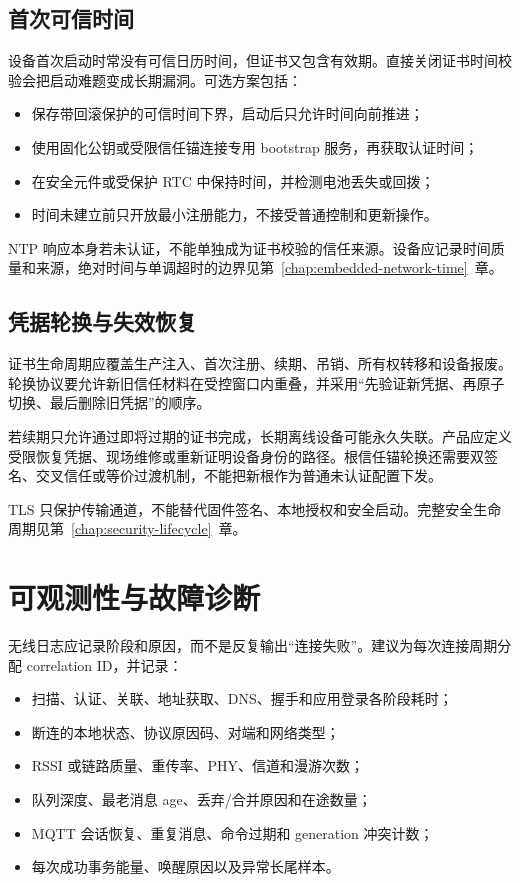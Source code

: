 \subsection{首次可信时间}

设备首次启动时常没有可信日历时间，但证书又包含有效期。直接关闭证书时间校验会把启动难题变成长期漏洞。可选方案包括：

\begin{itemize}
  \item 保存带回滚保护的可信时间下界，启动后只允许时间向前推进；
  \item 使用固化公钥或受限信任锚连接专用 bootstrap 服务，再获取认证时间；
  \item 在安全元件或受保护 RTC 中保持时间，并检测电池丢失或回拨；
  \item 时间未建立前只开放最小注册能力，不接受普通控制和更新操作。
\end{itemize}

NTP 响应本身若未认证，不能单独成为证书校验的信任来源。设备应记录时间质量和来源，绝对时间与单调超时的边界见\mbox{第~\ref{chap:embedded-network-time}~章}。

\subsection{凭据轮换与失效恢复}

证书生命周期应覆盖生产注入、首次注册、续期、吊销、所有权转移和设备报废。轮换协议要允许新旧信任材料在受控窗口内重叠，并采用“先验证新凭据、再原子切换、最后删除旧凭据”的顺序。

若续期只允许通过即将过期的证书完成，长期离线设备可能永久失联。产品应定义受限恢复凭据、现场维修或重新证明设备身份的路径。根信任锚轮换还需要双签名、交叉信任或等价过渡机制，不能把新根作为普通未认证配置下发。

TLS 只保护传输通道，不能替代固件签名、本地授权和安全启动。完整安全生命周期见\mbox{第~\ref{chap:security-lifecycle}~章}。

\section{可观测性与故障诊断}

无线日志应记录阶段和原因，而不是反复输出“连接失败”。建议为每次连接周期分配 correlation ID，并记录：

\begin{itemize}
  \item 扫描、认证、关联、地址获取、DNS、握手和应用登录各阶段耗时；
  \item 断连的本地状态、协议原因码、对端和网络类型；
  \item RSSI 或链路质量、重传率、PHY、信道和漫游次数；
  \item 队列深度、最老消息 age、丢弃/合并原因和在途数量；
  \item MQTT 会话恢复、重复消息、命令过期和 generation 冲突计数；
  \item 每次成功事务能量、唤醒原因以及异常长尾样本。
\end{itemize}


